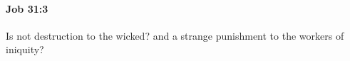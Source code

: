 
		\paragraph{Job 31:3} %
			\label{JOB-31-3}

			Is not destruction to the wicked? and a strange punishment to the workers of iniquity?


